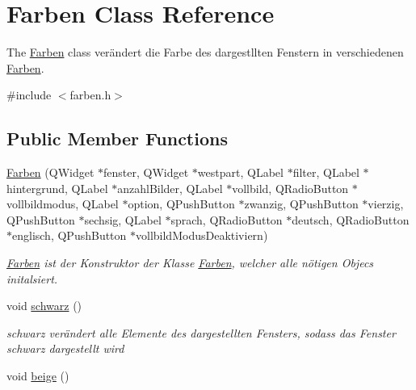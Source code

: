 \hypertarget{class_farben}{}\section{Farben Class Reference}
\label{class_farben}


The \hyperlink{class_farben}{Farben} class verändert die Farbe des dargestllten Fenstern in verschiedenen \hyperlink{class_farben}{Farben}.  




{\ttfamily \#include $<$farben.\+h$>$}

\subsection*{Public Member Functions}
\begin{DoxyCompactItemize}
\item 
\hyperlink{class_farben_ac889c39f03658503beda931540d54ce3}{Farben} (Q\+Widget $\ast$fenster, Q\+Widget $\ast$westpart, Q\+Label $\ast$filter, Q\+Label $\ast$hintergrund, Q\+Label $\ast$anzahl\+Bilder, Q\+Label $\ast$vollbild, Q\+Radio\+Button $\ast$vollbildmodus, Q\+Label $\ast$option, Q\+Push\+Button $\ast$zwanzig, Q\+Push\+Button $\ast$vierzig, Q\+Push\+Button $\ast$sechsig, Q\+Label $\ast$sprach, Q\+Radio\+Button $\ast$deutsch, Q\+Radio\+Button $\ast$englisch, Q\+Push\+Button $\ast$vollbild\+Modus\+Deaktiviern)
\begin{DoxyCompactList}\small\item\em \hyperlink{class_farben}{Farben} ist der Konstruktor der Klasse \hyperlink{class_farben}{Farben}, welcher alle nötigen Objecs initalsiert. \end{DoxyCompactList}\item 
void \hyperlink{class_farben_ade4a3a4016b08122d9536f80e2c56f49}{schwarz} ()\hypertarget{class_farben_ade4a3a4016b08122d9536f80e2c56f49}{}\label{class_farben_ade4a3a4016b08122d9536f80e2c56f49}

\begin{DoxyCompactList}\small\item\em schwarz verändert alle Elemente des dargestellten Fensters, sodass das Fenster schwarz dargestellt wird \end{DoxyCompactList}\item 
void \hyperlink{class_farben_a35f132929dd56b53d1d6af6aa434fbfb}{beige} ()\hypertarget{class_farben_a35f132929dd56b53d1d6af6aa434fbfb}{}\label{class_farben_a35f132929dd56b53d1d6af6aa434fbfb}


\end{DoxyCompactItemize}
